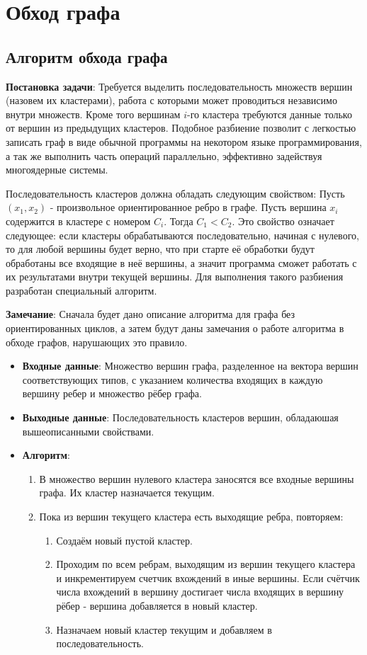 \clearpage
\section{Обход графа}
\subsection{Алгоритм обхода графа}
\textbf{Постановка задачи}: Требуется выделить последовательность множеств вершин (назовем их кластерами), работа с которыми может проводиться независимо внутри множеств. Кроме того вершинам $i$-го кластера требуются данные только от вершин из предыдущих кластеров. Подобное разбиение позволит с легкостью записать граф в виде обычной программы на некотором языке программирования, а так же выполнить часть операций параллельно, эффективно задействуя многоядерные системы.
\par
Последовательность кластеров должна обладать следующим свойством: Пусть $(x_1, x_2)$ - произвольное ориентированное ребро в графе. Пусть вершина $x_i$ содержится в кластере с номером $C_i$. Тогда $C_1 < C_2$. Это свойство означает следующее: если кластеры обрабатываются последовательно, начиная с нулевого, то для любой вершины будет верно, что при старте её обработки будут обработаны все входящие в неё вершины, а значит программа сможет работать с их результатами внутри текущей вершины. Для выполнения такого разбиения разработан специальный алгоритм. 
\par
\textbf{Замечание}: Сначала будет дано описание алгоритма для графа без ориентированных циклов, а затем будут даны замечания о работе алгоритма в обходе графов, нарушающих это правило.
\begin{itemize}
    \item \textbf{Входные данные}: Множество вершин графа, разделенное на вектора вершин соответствующих типов, с указанием количества входящих в каждую вершину ребер и множество рёбер графа.
    \item \textbf{Выходные данные}: Последовательность кластеров вершин, обладаюшая вышеописанными свойствами. 
    \item \textbf{Алгоритм}: \begin{enumerate}
        \item В множество вершин нулевого кластера заносятся все входные вершины графа. Их кластер назначается текущим.
        \item Пока из вершин текущего кластера есть выходящие ребра, повторяем:
        \begin{enumerate}
        \item Создаём новый пустой кластер.
            \item Проходим по всем ребрам, выходящим из вершин текущего кластера и инкрементируем счетчик вхождений в иные вершины. Если счётчик числа вхождений в вершину достигает числа входящих в вершину рёбер - вершина добавляется в новый кластер.
        \item Назначаем новый кластер текущим и добавляем в последовательность. 
        \end{enumerate}
    \end{enumerate}
\end{itemize}
